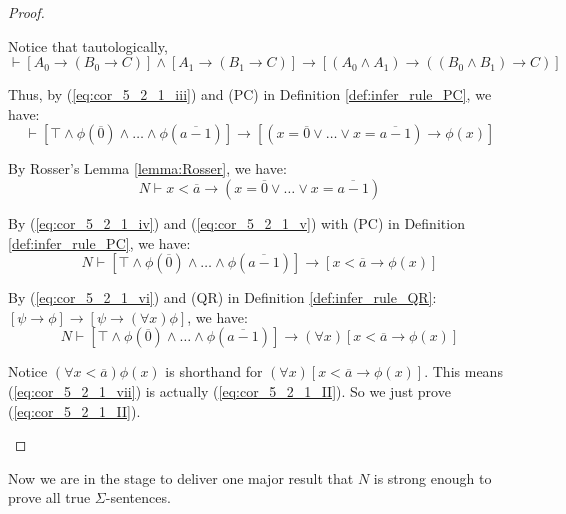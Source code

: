 \documentclass[11pt,letterpaper]{book}
\theoremstyle{definition}
\begin{document}
\begin{proof}
\begin{itemize}
{Notice that tautologically,
\begin{equation}
\vdash [A_0 \rightarrow (B_0 \rightarrow C) ] \land [A_1 \rightarrow (B_1 \rightarrow C )] \rightarrow [ (A_0 \land A_1) \rightarrow ( (B_0 \land B_1) \rightarrow C ) ] \nonumber
\end{equation}

Thus, by (\ref{eq:cor_5_2_1_iii}) and (PC) in Definition \ref{def:infer_rule_PC}, we have:
\begin{equation}
\vdash [ \top \land \phi(\overline{0})  \land \ldots \land \phi (\overline{a-1}) ] \rightarrow [(x = \overline{0} \lor \ldots \lor x = \overline{a-1} ) \rightarrow \phi(x) ] \label{eq:cor_5_2_1_iv} \tag{iv}
\end{equation}

By Rosser's Lemma \ref{lemma:Rosser}, we have:
\begin{equation}
N \vdash x < \overline{a} \rightarrow (x = \overline{0} \lor \ldots \lor x = \overline{a-1} ) \label{eq:cor_5_2_1_v} \tag{v}
\end{equation}

By (\ref{eq:cor_5_2_1_iv}) and (\ref{eq:cor_5_2_1_v}) with (PC) in Definition \ref{def:infer_rule_PC}, we have:
\begin{equation}
N \vdash [ \top \land \phi(\overline{0})  \land \ldots \land \phi (\overline{a-1}) ] \rightarrow [x < \overline{a} \rightarrow \phi(x) ] \label{eq:cor_5_2_1_vi} \tag{vi}
\end{equation}

By (\ref{eq:cor_5_2_1_vi}) and (QR) in Definition \ref{def:infer_rule_QR}: $ [\psi \rightarrow \phi ] \rightarrow [ \psi \rightarrow (\forall x ) \phi  ]$, we have:
\begin{equation}
N \vdash [ \top \land \phi(\overline{0})  \land \ldots \land \phi (\overline{a-1}) ] \rightarrow (\forall x ) [x < \overline{a} \rightarrow \phi(x) ] \label{eq:cor_5_2_1_vii} \tag{vii}
\end{equation}

Notice $(\forall x  < \overline{a} )  \phi(x) $ is shorthand for $(\forall x ) [x < \overline{a} \rightarrow \phi(x) ]$. This means (\ref{eq:cor_5_2_1_vii}) is actually (\ref{eq:cor_5_2_1_II}). So we just prove (\ref{eq:cor_5_2_1_II}).
}
\end{itemize}

\end{proof}

Now we are in the stage to deliver one major result that $N$ is strong enough to
prove all true $\Sigma$-sentences.
\end{document}
